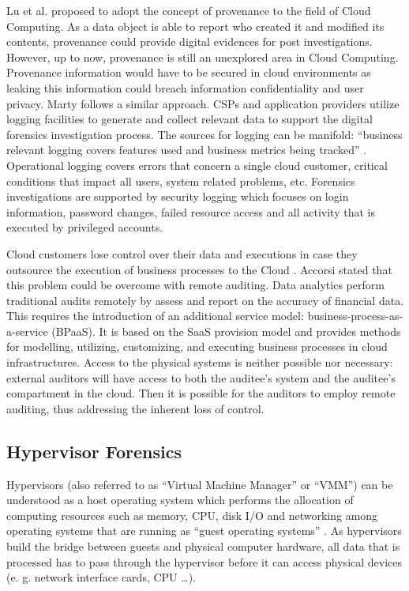 \documentclass[runningheads,a4paper]{llncs}
\begin{document}
Lu et al. \cite{Lu2010} proposed to adopt the concept of provenance to the field of Cloud Computing. As a data object is able to report who created it and modified its contents, provenance could provide digital evidences for post investigations. However, up to now, provenance is still an unexplored area in Cloud Computing. Provenance information would have to be secured in cloud environments as leaking this information could breach information confidentiality and user privacy. Marty \cite{Marty2011} follows a similar approach. CSPs and application providers utilize logging facilities to generate and collect relevant data to support the digital forensics investigation process. The sources for logging can be manifold: ``business relevant logging covers features used and business metrics being tracked'' \cite{Marty2011}. Operational logging covers errors that concern a single cloud customer, critical conditions that impact all users, system related problems, etc. Forensics investigations are supported by security logging which focuses on login information, password changes, failed resource access and all activity that is executed by privileged accounts. 

Cloud customers lose control over their data and executions in case they outsource the execution of business processes to the Cloud \cite{Chow2009}. Accorsi \cite{Accorsi2011} stated that this problem could be overcome with remote auditing. Data analytics perform traditional audits remotely by assess and report on the accuracy of financial data. This requires the introduction of an additional service model: business-process-as-a-service (BPaaS). It is based on the SaaS provision model and provides methods for modelling, utilizing, customizing, and executing business processes in cloud infrastructures. Access to the physical systems is neither possible nor necessary: external auditors will have access to both the auditee's system and the auditee's compartment in the cloud. Then it is possible for the auditors to employ remote auditing, thus addressing the inherent loss of control. 

\subsection{Hypervisor Forensics}

Hypervisors (also referred to as ``Virtual Machine Manager'' or ``VMM'') can be understood as a host operating system which performs the allocation of computing resources such as memory, CPU, disk I/O and networking among operating systems that are running as ``guest operating systems'' \cite{Lillard2010}. As hypervisors build the bridge between guests and physical computer hardware, all data that is processed has to pass through the hypervisor before it can access physical devices (e. g. network interface cards, CPU \ldots). 
\end{document}
